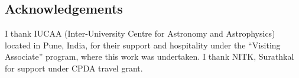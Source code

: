 \documentclass[a0,portrait]{a0poster}
\begin{document}
\begin{multicols}{3}



\color{DarkRed}

\section*{Acknowledgements}

I thank IUCAA (Inter-University Centre for Astronomy and Astrophysics) located in Pune, India, for their support and hospitality under the ``Visiting Associate'' program, where this work was undertaken. I thank NITK, Surathkal for support under CPDA travel grant.


\color{Navy}

\printbibliography[title={References}]

\end{multicols}
\end{document}
